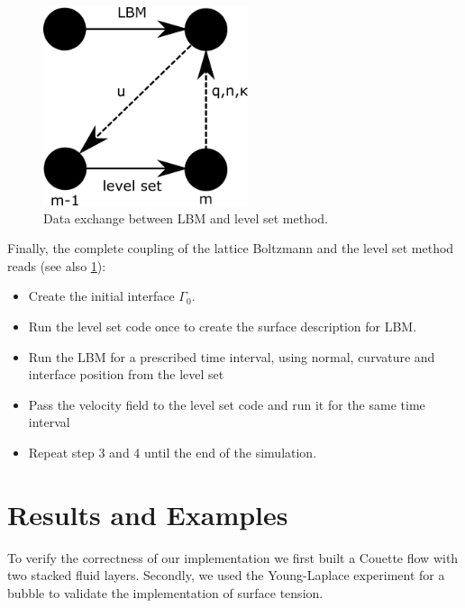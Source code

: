 \documentclass[final,leqno,onefignum,onetabnum]{siamltexmm}
\begin{document}
\begin{figure}
	\hfill\includegraphics[width=6cm,natwidth=632,natheight=562]{dataexchange.png}\hspace*{\fill}
	\caption{Data exchange between LBM and level set method.}
	\label{dataexchange}
\end{figure}
Finally, the complete coupling of the lattice Boltzmann and the level set method reads (see also \cref{dataexchange}):
\begin{itemize}
	\item[1.] Create the initial interface $\Gamma_0$.
	\item[2.] Run the level set code once to create the surface description for LBM.
	\item[3.] Run the LBM  for a prescribed time interval, using normal, curvature and interface position from the level set
	\item[4.] Pass the velocity field to the level set code and run it for the same time interval
	\item[5.] Repeat step 3 and 4 until the end of the simulation.
\end{itemize}

\section{Results and Examples}
To verify the correctness of our implementation we first built a Couette flow with two stacked fluid layers. Secondly, we used the Young-Laplace experiment for a bubble to validate the implementation of surface tension.
\end{document}
